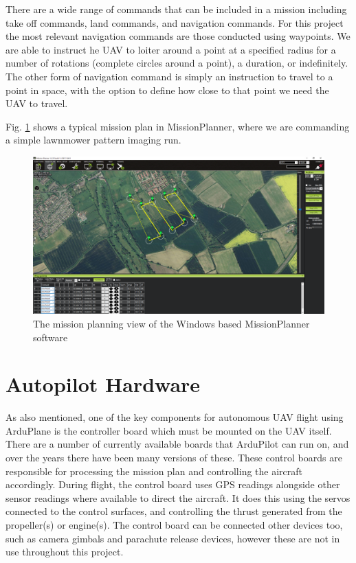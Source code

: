 There are a wide range of commands that can be included in a mission including take off commands, land commands, and navigation commands. For this project the most relevant navigation commands are those conducted using waypoints. We are able to instruct he UAV to loiter around a point at a specified radius for a number of rotations (complete circles around a point), a duration, or indefinitely. The other form of navigation command is simply an instruction to travel to a point in space, with the option to define how close to that point we need the UAV to travel. 

Fig. \ref{fig:missionplanner} shows a typical mission plan in MissionPlanner, where we are commanding a simple lawnmower pattern imaging run. 

\begin{figure}[htbp!] 
\centering    
\includegraphics[width=\textwidth]{MissionPlanner}
\caption[MissionPlanner Desktop Software]{The mission planning view of the Windows based MissionPlanner software}
\label{fig:missionplanner}
\end{figure}

\section{Autopilot Hardware} 
\label{intro:hardware}

As also mentioned, one of the key components for autonomous UAV flight using ArduPlane is the controller board which must be mounted on the UAV itself. There are a number of currently available boards that ArduPilot can run on, and over the years there have been many versions of these. These control boards are responsible for processing the mission plan and controlling the aircraft accordingly. During flight, the control board uses GPS readings alongside other sensor readings where available to direct the aircraft. It does this using the servos connected to the control surfaces, and controlling the thrust generated from the propeller(s) or engine(s). The control board can be connected other devices too, such as camera gimbals and parachute release devices, however these are not in use throughout this project. 


